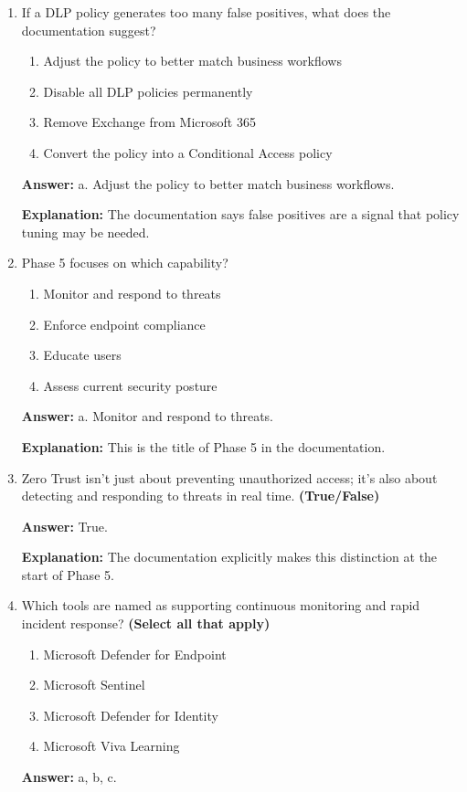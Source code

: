 \documentclass[10pt]{article}
\begin{document}
\begin{enumerate}[leftmargin=*]
\textbf{Explanation:} The documentation presents these as the core elements of effective data protection and continuous improvement.

\item If a DLP policy generates too many false positives, what does the documentation suggest?
\begin{enumerate}[label=\alph*., leftmargin=1.5em]
\item Adjust the policy to better match business workflows
\item Disable all DLP policies permanently
\item Remove Exchange from Microsoft 365
\item Convert the policy into a Conditional Access policy
\end{enumerate}
\textbf{Answer:} a. Adjust the policy to better match business workflows.

\textbf{Explanation:} The documentation says false positives are a signal that policy tuning may be needed.

\item Phase 5 focuses on which capability?
\begin{enumerate}[label=\alph*., leftmargin=1.5em]
\item Monitor and respond to threats
\item Enforce endpoint compliance
\item Educate users
\item Assess current security posture
\end{enumerate}
\textbf{Answer:} a. Monitor and respond to threats.

\textbf{Explanation:} This is the title of Phase 5 in the documentation.

\item Zero Trust isn’t just about preventing unauthorized access; it’s also about detecting and responding to threats in real time. \textbf{(True/False)}

\textbf{Answer:} True.

\textbf{Explanation:} The documentation explicitly makes this distinction at the start of Phase 5.

\item Which tools are named as supporting continuous monitoring and rapid incident response? \textbf{(Select all that apply)}
\begin{enumerate}[label=\alph*., leftmargin=1.5em]
\item Microsoft Defender for Endpoint
\item Microsoft Sentinel
\item Microsoft Defender for Identity
\item Microsoft Viva Learning
\end{enumerate}
\textbf{Answer:} a, b, c.


\end{enumerate}
\end{document}
